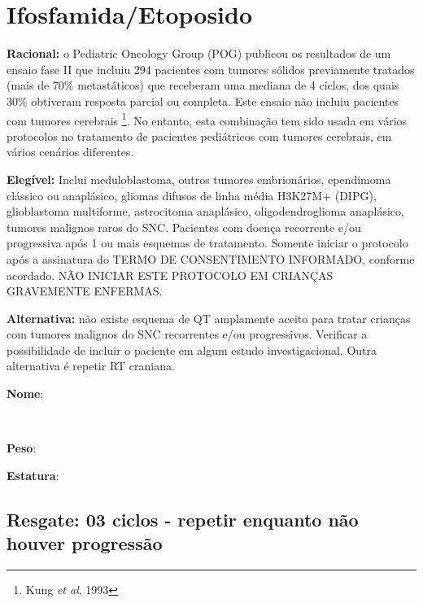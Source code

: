 \documentclass[11pt,a4paper,oldfontcommands]{memoir}
\def\entrywithlabel[#1]#2{\parbox{#1}{{\small #2:} \hrulefill}}
\begin{document}
\cleardoublepage
\section{Ifosfamida/Etoposido}
{\let\thefootnote\relax{}}
\textbf{Racional:} o Pediatric Oncology Group (POG) publicou os resultados de um ensaio fase II que incluiu 294 pacientes com tumores sólidos previamente tratados (mais de 70\% metastáticos) que receberam uma mediana de 4 ciclos, dos quais 30\% obtiveram resposta parcial ou completa. Este ensaio não incluiu pacientes com tumores cerebrais \footnote{Kung \textit{et al}, 1993}. No entanto, esta combinação tem sido usada em vários protocolos no tratamento de pacientes pediátricos com tumores cerebrais, em vários cenários diferentes.

\textbf{Elegível:} Inclui meduloblastoma, outros tumores embrionários, ependimoma clássico ou anaplásico, gliomas difusos de linha média H3K27M+ (DIPG), glioblastoma multiforme, astrocitoma anaplásico, oligodendroglioma anaplásico, tumores malignos raros do SNC. Pacientes com doença recorrente e/ou progressiva após 1 ou mais esquemas de tratamento. Somente iniciar o protocolo após a assinatura do TERMO DE CONSENTIMENTO INFORMADO, conforme acordado. NÃO INICIAR ESTE PROTOCOLO EM CRIANÇAS GRAVEMENTE ENFERMAS.

\textbf{Alternativa:} não existe esquema de QT amplamente aceito para tratar crianças com tumores malignos do SNC recorrentes e/ou progressivos. Verificar a possibilidade de incluir o paciente em algum estudo investigacional. Outra alternativa é repetir RT craniana.
\\[0.4cm]
\entrywithlabel[1\hsize]{\textbf{Nome}}\hfill
\\[0.3cm]
\entrywithlabel[.45\hsize]{\textbf{Peso}}\hfill  \entrywithlabel[.45\hsize]{\textbf{Estatura}}

\subsection{Resgate: 03 ciclos - repetir enquanto não houver progressão}
\end{document}

